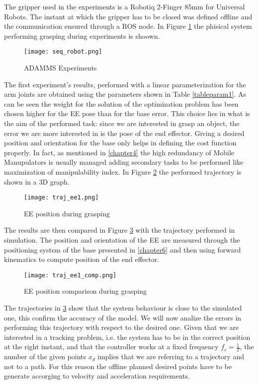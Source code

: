 	The gripper used in the experiments is a Robotiq 2-Finger 85mm for Universal Robots. The instant at which the gripper has to be closed was defined offline and the communication ensured through a ROS node. In Figure \ref{seq_robot} the phisical system performing grasping during experiments is shoown.
	\begin{figure}[h!]
	\centering
	\texttt{[image: seq\_robot.png]}
	\caption{ADAMMS Experiments}
	\label{seq_robot}
	\end{figure}
	The first experiment's results, performed with a linear parameterization for the arm joints are obtained using the parameters shown in Table \ref{tableparam1}. As can be seen the weight for the solution of the optimization problem has been chosen higher for the EE pose than for the base error. This choice lies in what is the aim of the performed task: since we are interested in grasp an object, the error we are more interested in is the pose of the end effector. Giving a desired position and orientation for the base only helps in defining the cost function properly. In fact, as mentioned in \ref{chapter4} the high redundancy of Mobile Manupulators is usually managed adding secondary tasks to be performed like maximization of manipulability index. 
	In Figure \ref{traj_ee1} the performed trajectory is shown in a 3D graph. 
	\begin{figure}[h!]
	\centering
	\texttt{[image: traj\_ee1.png]}
	\caption{EE position during grasping}
	\label{traj_ee1}
	\end{figure}
	The results are then compared in Figure \ref{traj_ee1_comp} with the trajectory performed in simulation. The position and orientation of the EE are measured through the positioning system of the base presented in \ref{chapter6} and then using forward kinematics to compute position of the end effector. 
	\begin{figure}[h!]
	\centering
	\texttt{[image: traj\_ee1\_comp.png]}
	\caption{EE position comparison during grasping}
	\label{traj_ee1_comp}
	\end{figure}
	The trajectories in \ref{traj_ee1_comp} show that the system behaviour is close to the simulated one, this confirm the accuracy of the model. We will now analize the errors in performing this trajectory with respect to the desired one.  
	Given that we are interested in a tracking problem, i.e. the system has to be in the correct position at the right instant, and that the controller works at a fixed frequency $f_c=\frac{1}{T}$, the number of the given points $x_d$ implies that we are referring to a trajectory and not to a path. For this reason the offline planned desired points have to be generate accorging to velocity and acceleration requirements. 
